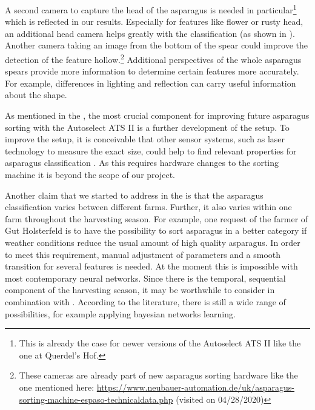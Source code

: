 A second camera to capture the head of the asparagus is needed in particular\footnote{This is already the case for newer versions of the Autoselect ATS II like the one at Querdel’s Hof.} which is reflected in our results. Especially for features like flower or rusty head, an additional head camera helps greatly with the classification (as shown in ). Another camera taking an image from the bottom of the spear could improve the detection of the feature hollow.\footnote{These cameras are already part of new asparagus sorting hardware like the one mentioned here: \url{https://www.neubauer-automation.de/uk/asparagus-sorting-machine-espaso-technicaldata.php} (visited on 04/28/2020)} Additional perspectives of the whole asparagus spears provide more information to determine certain features more accurately. For example, differences in lighting and reflection can carry useful information about the shape.

As mentioned in the , the most crucial component for improving future asparagus sorting with the Autoselect ATS II is a further development of the setup. To improve the setup, it is conceivable that other sensor systems, such as laser technology to measure the exact size, could help to find relevant properties for asparagus classification \citep{bhargava2018fruits}. As this requires hardware changes to the sorting machine it is beyond the scope of our project.

\bigskip
Another claim that we started to address in the 
is that the asparagus classification varies between different farms. Further, it also varies within one farm throughout the harvesting season. For example, one request of the farmer of Gut Holsterfeld is to have the possibility to sort asparagus in a better category if weather conditions reduce the usual amount of high quality asparagus. In order to meet this requirement, manual adjustment of parameters and a smooth transition for several features is needed. At the moment this is impossible with most contemporary neural networks. Since there is the temporal, sequential component of the harvesting season, it may be worthwhile to consider  in combination with . According to the literature, there is still a wide range of possibilities, for example applying bayesian networks learning.

